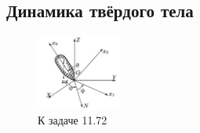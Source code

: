 \subsection{Динамика твёрдого тела}






\begin{figure}
    \centering
    \includegraphics[width=0.25\textwidth]{figures/LL1.png}
    \caption{К задаче 11.72}
\end{figure}



